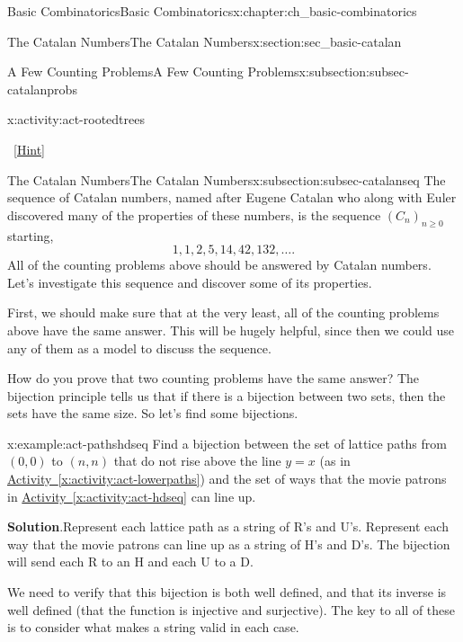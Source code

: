 \documentclass[oneside,10pt,]{book}
\numberwithin{equation}{chapter}
\newcommand{\vtx}[2]{node[fill,circle,inner sep=0pt, minimum size=4pt,label=#1:#2]{}}
\renewcommand{\v}{\vtx{above}{}}
\begin{document}
\begin{chapterptx}{Basic Combinatorics}{}{Basic Combinatorics}{}{}{x:chapter:ch_basic-combinatorics}
\begin{sectionptx}{The Catalan Numbers}{}{The Catalan Numbers}{}{}{x:section:sec_basic-catalan}
\begin{subsectionptx}{A Few Counting Problems}{}{A Few Counting Problems}{}{}{x:subsection:subsec-catalanprobs}
\begin{activity}{}{x:activity:act-rootedtrees}
\begin{sidebyside}{2}{0.125}{0.125}{0.25}
\begin{sbspanel}{0.25}
{
}%
\end{sbspanel}%
\end{sidebyside}%
\qquad~\hfill{\tiny\hyperlink{g:hint:idm3517-back}{[Hint]}}\end{activity}
\end{subsectionptx}
%
%
\typeout{************************************************}
\typeout{************************************************}
%
\begin{subsectionptx}{The Catalan Numbers}{}{The Catalan Numbers}{}{}{x:subsection:subsec-catalanseq}
The sequence of Catalan numbers, named after Eugene Catalan who along with Euler discovered many of the properties of these numbers, is the sequence \((C_n)_{n \ge 0}\) starting,%
\begin{equation*}
1, 1, 2, 5, 14, 42, 132, \ldots\text{.}
\end{equation*}
All of the counting problems above should be answered by Catalan numbers.  Let's investigate this sequence and discover some of its properties.%
\par
First, we should make sure that at the very least, all of the counting problems above have the same answer.  This will be hugely helpful, since then we could use any of them as a model to discuss the sequence.%
\par
How do you prove that two counting problems have the same answer?  The bijection principle tells us that if there is a bijection between two sets, then the sets have the same size.  So let's find some bijections.%
\begin{example}{}{x:example:act-pathshdseq}%
Find a bijection between the set of lattice paths from \((0,0)\) to \((n,n)\) that do not rise above the line \(y = x\) (as in \hyperref[x:activity:act-lowerpaths]{Activity~\ref{x:activity:act-lowerpaths}}) and the set of ways that the movie patrons in \hyperref[x:activity:act-hdseq]{Activity~\ref{x:activity:act-hdseq}} can line up.%
\par\smallskip%
\noindent\textbf{Solution}.\hypertarget{g:solution:idm3535}{}\quad{}Represent each lattice path as a string of R's and U's.  Represent each way that the movie patrons can line up as a string of H's and D's.  The bijection will send each R to an H and each U to a D.%
\par
We need to verify that this bijection is both well defined, and that its inverse is well defined (that the function is injective and surjective).  The key to all of these is to consider what makes a string valid in each case.%

\end{example}
\end{subsectionptx}
\end{sectionptx}
\end{chapterptx}
\end{document}
